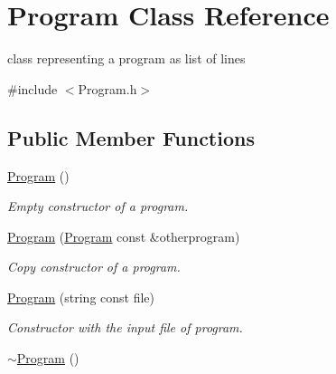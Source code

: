 \hypertarget{classProgram}{\section{\-Program \-Class \-Reference}
\label{classProgram}
}


class representing a program as list of lines  




{\ttfamily \#include $<$\-Program.\-h$>$}

\subsection*{\-Public \-Member \-Functions}
\begin{DoxyCompactItemize}
\item 
\hypertarget{classProgram_aaefaa0df08f3484476fc4d61e97acbdc}{\hyperlink{classProgram_aaefaa0df08f3484476fc4d61e97acbdc}{\-Program} ()}\label{classProgram_aaefaa0df08f3484476fc4d61e97acbdc}

\begin{DoxyCompactList}\small\item\em \-Empty constructor of a program. \end{DoxyCompactList}\item 
\hypertarget{classProgram_a9918fe797bf830c47a652c81f449c35c}{\hyperlink{classProgram_a9918fe797bf830c47a652c81f449c35c}{\-Program} (\hyperlink{classProgram}{\-Program} const \&otherprogram)}\label{classProgram_a9918fe797bf830c47a652c81f449c35c}

\begin{DoxyCompactList}\small\item\em \-Copy constructor of a program. \end{DoxyCompactList}\item 
\hypertarget{classProgram_aabe3dfc72075de14b189b22b0e33ff23}{\hyperlink{classProgram_aabe3dfc72075de14b189b22b0e33ff23}{\-Program} (string const file)}\label{classProgram_aabe3dfc72075de14b189b22b0e33ff23}

\begin{DoxyCompactList}\small\item\em \-Constructor with the input file of program. \end{DoxyCompactList}\item 
\hypertarget{classProgram_a986aef1c50e1d338a3315a47ba6df549}{\hyperlink{classProgram_a986aef1c50e1d338a3315a47ba6df549}{$\sim$\-Program} ()}\label{classProgram_a986aef1c50e1d338a3315a47ba6df549}


\end{DoxyCompactItemize}
